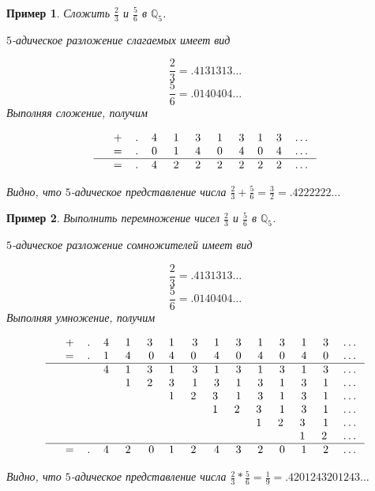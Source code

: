 \documentclass[master, och, diploma, times]{sty/SCWorks}
\theoremstyle{plain}
\newtheorem{exmp}{Пример}[section]
\theoremstyle{definition}
\numberwithin{equation}{section}
\begin{document}
\begin{exmp}
Сложить $\frac{2}{3}$ и $\frac{5}{6}$ в $\mathbb{Q}_5$.

\noindent $5$-адическое разложение слагаемых имеет вид

$$
\frac{2}{3}=.4131313\dots
$$
$$
\frac{5}{6}=.0140404\dots
$$
Выполняя сложение, получим

$$
\begin{tabular}{cccccccccccc}
& + & . & 4\; & 1\; & 3\; & 1\; & 3 & 1 & 3 & \dots \\
& = & . & 0\; & 1\; & 4\; & 0\; & 4 & 0 & 4 & \dots \\
\hline
& = & . & 4\; & 2\; & 2\; & 2\; & 2 & 2 & 2 & \dots
\end{tabular}
$$

\noindent Видно, что $5$-адическое представление числа $\frac{2}{3} + \frac{5}{6}=\frac{3}{2}=.4222222\dots$
\end{exmp}

\begin{exmp}
Выполнить перемножение чисел $\frac{2}{3}$ и $\frac{5}{6}$ в $\mathbb{Q}_5$.

\noindent $5$-адическое разложение сомножителей имеет вид

$$
\frac{2}{3}=.4131313\dots
$$
$$
\frac{5}{6}=.0140404\dots
$$
Выполняя умножение, получим

$$
\begin{tabular}{ccccccccccccccccc}
& + & . & 4\; & 1\; & 3\; & 1\; & 3 & 1 & 3 & 1 & 3 & 1 & 3 & \dots \\
& = & . & 1\; & 4\; & 0 & 4\; & 0\; & 4 & 0 & 4 & 0 & 4 & 0 & \dots \\
\hline
& & & 4\; & 1\; & 3\; & 1\; & 3 & 1 & 3 & 1 & 3 & 1 & 3 & \dots \\
& & & & 1\; & 2\; & 3\; & 1 & 3 & 1 & 3 & 1 & 3 & 1 & \dots \\
& & & & & & 1\; & 2\; & 3\; & 1 & 3 & 1 & 3 & 1 & \dots \\
& & & & & & & & 1\; & 2\; & 3\; & 1 & 3 & 1 & \dots \\
& & & & & & & & & & 1\; & 2\; & 3\; & 1 &  \dots \\
& & & & & & & & & & & & 1\; & 2\; & \dots \\
\hline
& = & . & 4\; & 2\; & 0 & 1\; & 2\; & 4 & 3 & 2 & 0 & 1 & 2 & \dots \\
\end{tabular}
$$

\noindent Видно, что $5$-адическое представление числа $\frac{2}{3} * \frac{5}{6}=\frac{1}{9}=.4201243201243\dots$
\end{exmp}
\end{document}
